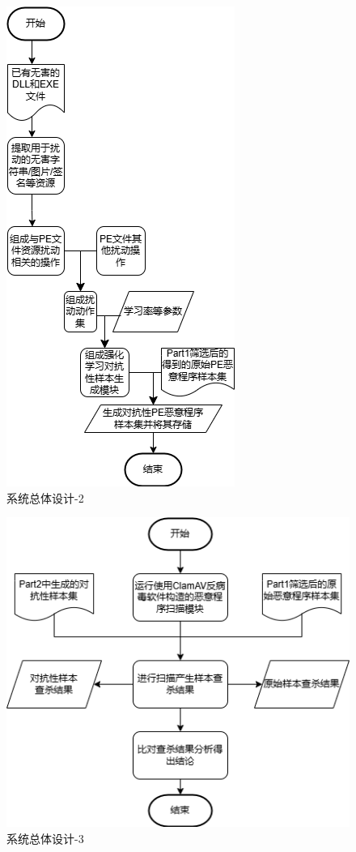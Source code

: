 \begin{figure}[htbp]
  \centering
  \includegraphics[]{images/system_design2.png}
  \caption{系统总体设计-2}\label{fig:system_design2}
\end{figure}

\begin{figure}[htbp]
  \centering
  \includegraphics[]{images/system_design3.png}
  \caption{系统总体设计-3}\label{fig:system_design3}
\end{figure}

